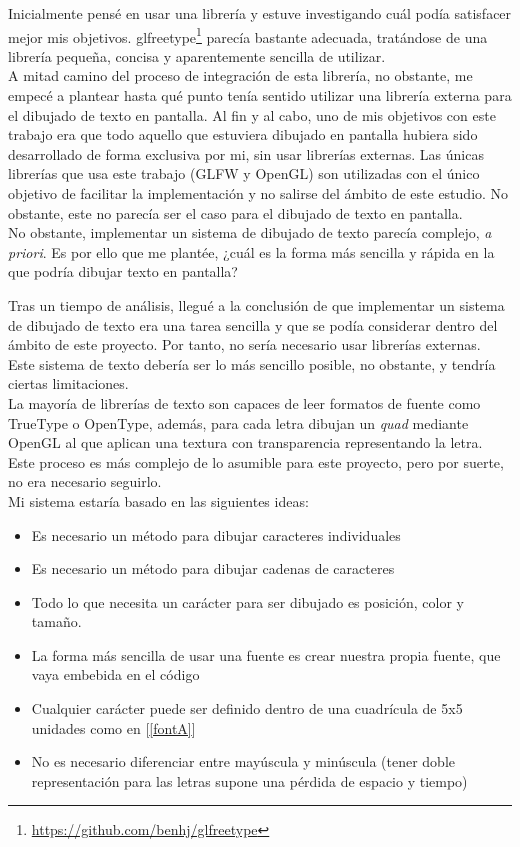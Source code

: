 Inicialmente pensé en usar una librería y estuve investigando cuál podía satisfacer mejor mis objetivos. glfreetype\footnote{\url{https://github.com/benhj/glfreetype}} parecía bastante adecuada, tratándose de una librería pequeña, concisa y aparentemente sencilla de utilizar.\\

A mitad camino del proceso de integración de esta librería, no obstante, me empecé a plantear hasta qué punto tenía sentido utilizar una librería externa para el dibujado de texto en pantalla. Al fin y al cabo, uno de mis objetivos con este trabajo era que todo aquello que estuviera dibujado en pantalla hubiera sido desarrollado de forma exclusiva por mi, sin usar librerías externas. Las únicas librerías que usa este trabajo (GLFW y OpenGL) son utilizadas con el único objetivo de facilitar la implementación y no salirse del ámbito de este estudio. No obstante, este no parecía ser el caso para el dibujado de texto en pantalla.\\

No obstante, implementar un sistema de dibujado de texto parecía complejo, \emph{a priori}. Es por ello que me plantée, ¿cuál es la forma más sencilla y rápida en la que podría dibujar texto en pantalla?

Tras un tiempo de análisis, llegué a la conclusión de que implementar un sistema de dibujado de texto era una tarea sencilla y que se podía considerar dentro del ámbito de este proyecto. Por tanto, no sería necesario usar librerías externas. Este sistema de texto debería ser lo más sencillo posible, no obstante, y tendría ciertas limitaciones.\\

La mayoría de librerías de texto son capaces de leer formatos de fuente como TrueType o OpenType, además, para cada letra dibujan un \emph{quad} mediante OpenGL al que aplican una textura con transparencia representando la letra. Este proceso es más complejo de lo asumible para este proyecto, pero por suerte, no era necesario seguirlo.\\

Mi sistema estaría basado en las siguientes ideas: 
\begin{itemize}
	\item Es necesario un método para dibujar caracteres individuales
	\item Es necesario un método para dibujar cadenas de caracteres
	\item Todo lo que necesita un carácter para ser dibujado es posición, color y tamaño.
	\item La forma más sencilla de usar una fuente es crear nuestra propia fuente, que vaya embebida en el código
	\item Cualquier carácter puede ser definido dentro de una cuadrícula de 5x5 unidades como en [\ref{fontA}]
	\item No es necesario diferenciar entre mayúscula y minúscula (tener doble representación para las letras supone una pérdida de espacio y tiempo)
\end{itemize}

